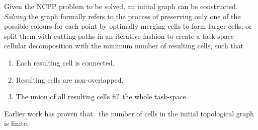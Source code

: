 \documentclass[journal]{IEEEtran}
\begin{document}
Given the NCPP problem to be solved, an initial graph can be constructed. \textit{Solving} the graph formally refers to the process of preserving only one of the possible colours for each point by optimally merging cells to form larger cells, or split them with cutting paths in an iterative fashion to create a task-space cellular decomposition with the minimum number of resulting cells, such that 
\begin{enumerate}
\item Each resulting cell is connected.
\item Resulting cells are non-overlapped.
\item The union of all resulting cells fill the whole task-space.
\end{enumerate}
Earlier work has proven that~\cite{Yang2020Cellular} 
the number of cells in the initial topological graph is finite. 
\end{document}
